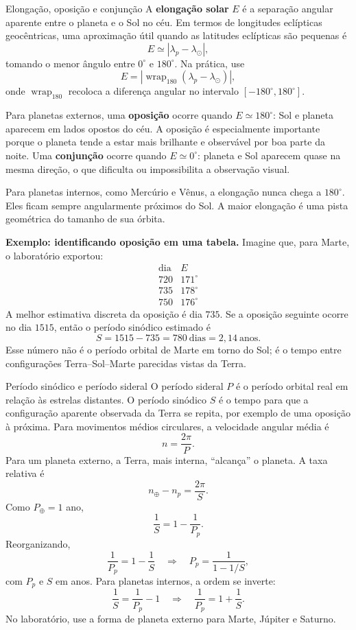 \documentclass[11pt,a4paper]{article}
\begin{document}
\begin{lessonblock}[borderline west={2pt}{0pt}{astroBlue}]{Elongação, oposição e conjunção}
A \textbf{elongação solar} $E$ é a separação angular aparente entre o planeta e o Sol no céu. Em termos de longitudes eclípticas geocêntricas, uma aproximação útil quando as latitudes eclípticas são pequenas é
\[
E\simeq |\lambda_p-\lambda_\odot|,
\]
tomando o menor ângulo entre $0^\circ$ e $180^\circ$. Na prática, use
\[
E=\left|\operatorname{wrap}_{180}(\lambda_p-\lambda_\odot)\right|,
\]
onde $\operatorname{wrap}_{180}$ recoloca a diferença angular no intervalo $[-180^\circ,180^\circ]$.

Para planetas externos, uma \textbf{oposição} ocorre quando $E\simeq180^\circ$: Sol e planeta aparecem em lados opostos do céu. A oposição é especialmente importante porque o planeta tende a estar mais brilhante e observável por boa parte da noite. Uma \textbf{conjunção} ocorre quando $E\simeq0^\circ$: planeta e Sol aparecem quase na mesma direção, o que dificulta ou impossibilita a observação visual.

Para planetas internos, como Mercúrio e Vênus, a elongação nunca chega a $180^\circ$. Eles ficam sempre angularmente próximos do Sol. A maior elongação é uma pista geométrica do tamanho de sua órbita.
\end{lessonblock}

\textbf{Exemplo: identificando oposição em uma tabela.} Imagine que, para Marte, o laboratório exportou:
\[
\begin{array}{c|c}
\text{dia} & E\\
\hline
720 & 171^\circ\\
735 & 178^\circ\\
750 & 176^\circ
\end{array}
\]
A melhor estimativa discreta da oposição é dia $735$. Se a oposição seguinte ocorre no dia $1515$, então o período sinódico estimado é
\[
S=1515-735=780\ \text{dias}=2{,}14\ \text{anos}.
\]
Esse número não é o período orbital de Marte em torno do Sol; é o tempo entre configurações Terra--Sol--Marte parecidas vistas da Terra.

\begin{lessonblock}{Período sinódico e período sideral}
O período sideral $P$ é o período orbital real em relação às estrelas distantes. O período sinódico $S$ é o tempo para que a configuração aparente observada da Terra se repita, por exemplo de uma oposição à próxima. Para movimentos médios circulares, a velocidade angular média é
\[
n=\frac{2\pi}{P}.
\]
Para um planeta externo, a Terra, mais interna, ``alcança'' o planeta. A taxa relativa é
\[
n_\oplus-n_p=\frac{2\pi}{S}.
\]
Como $P_\oplus=1$ ano,
\[
\frac{1}{S}=1-\frac{1}{P_p}.
\]
Reorganizando,
\[
\frac{1}{P_p}=1-\frac{1}{S}
\quad\Rightarrow\quad
P_p=\frac{1}{1-1/S},
\]
com $P_p$ e $S$ em anos. Para planetas internos, a ordem se inverte:
\[
\frac{1}{S}=\frac{1}{P_p}-1
\quad\Rightarrow\quad
\frac{1}{P_p}=1+\frac{1}{S}.
\]
No laboratório, use a forma de planeta externo para Marte, Júpiter e Saturno.
\end{lessonblock}
\end{document}
